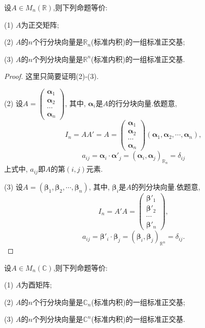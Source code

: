 \begin{theorem}
  设$A\in M_n(\mathbb{R})$,则下列命题等价:

  (1) $A$为正交矩阵;

  (2) $A$的$n$个行分块向量是$\mathbb{R}_n$(标准内积)的一组标准正交基;

  (3) $A$的$n$个列分块向量是$\mathbb{R}^n$(标准内积)的一组标准正交基.
\end{theorem}

\begin{proof}
  这里只简要证明(2)-(3).

  (2) 设$A=\begin{pmatrix} \bm{\alpha}_1\\\bm{\alpha}_2\\\cdots\\\bm{\alpha}_n\end{pmatrix}$,
    其中, $\bm{\alpha}_i$是$A$的行分块向量.依题意,
    \[
      I_n=AA'=A=\begin{pmatrix} \bm{\alpha}_1\\\bm{\alpha}_2\\\cdots\\\bm{\alpha}_n\end{pmatrix}
      (\bm{\alpha}_1,\bm{\alpha}_2,\cdots,\bm{\alpha}_n),
    \]
    \[
      a_{ij}=\bm{\alpha}_i\cdot\bm{\alpha}'_j=(\bm{\alpha}_i,\bm{\alpha}_j)_{\mathbb{R}_n}=\delta_{ij}
    \]
    上式中, $a_{ij}$即$A$的第$(i,j)$元素.

    (3) 设$A=(\bm{\beta}_1,\bm{\beta}_2,\cdots,\bm{\beta}_n)$,
    其中, $\bm{\beta}_i$是$A$的列分块向量.依题意,
    \[
      I_n=A'A=\begin{pmatrix}\bm{\beta}'_1\\\bm{\beta}'_2\\\cdots\\\bm{\beta}'_n\end{pmatrix},
    \]
    \[
      a_{ij}= \bm{\beta}'_i\cdot\bm{\beta}_j=(\bm{\beta}_i,\bm{\beta}_j)_{\mathbb{R}^n}=\delta_{ij}.
      \]
    \end{proof}

\begin{theorem}
  设$A\in M_n(\mathbb{C})$,则下列命题等价:

  (1) $A$为酉矩阵;

  (2) $A$的$n$个行分块向量是$\mathbb{C}_n$(标准内积)的一组标准正交基;

  (3) $A$的$n$个列分块向量是$\mathbb{C}^n$(标准内积)的一组标准正交基.
\end{theorem}

